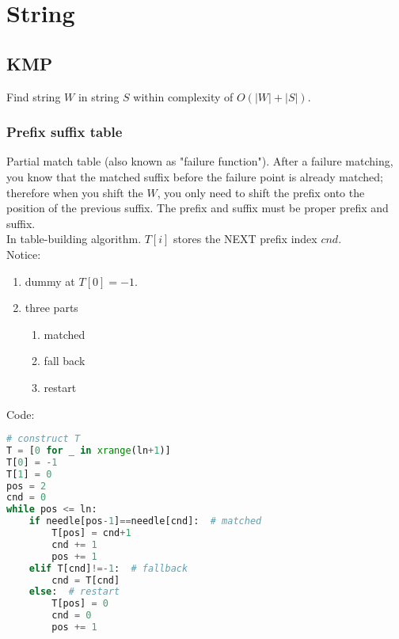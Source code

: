 \chapter{String}


\section{KMP}
Find string $W$ in string $S$ within complexity of $O(|W|+|S|)$.
\subsection{Prefix suffix table}
Partial match table (also known as "failure function"). After a failure matching, you know that the matched suffix before the failure point is already matched; therefore when you shift the $W$, you only need to shift the prefix onto the position of the previous suffix. The prefix and suffix must be proper prefix and suffix.\\

In table-building algorithm. $T[i]$ stores the NEXT prefix index $cnd$.\\

Notice:
\begin{enumerate}
\item dummy at $T[0]=-1$.
\item three parts
\begin{enumerate}
\item matched
\item fall back
\item restart 
\end{enumerate}
\end{enumerate}

Code:
\begin{lstlisting}[language=python]
# construct T
T = [0 for _ in xrange(ln+1)]
T[0] = -1
T[1] = 0
pos = 2
cnd = 0  
while pos <= ln:
    if needle[pos-1]==needle[cnd]:  # matched
        T[pos] = cnd+1
        cnd += 1
        pos += 1
    elif T[cnd]!=-1:  # fallback 
        cnd = T[cnd]
    else:  # restart 
        T[pos] = 0
        cnd = 0
        pos += 1

\end{lstlisting}


